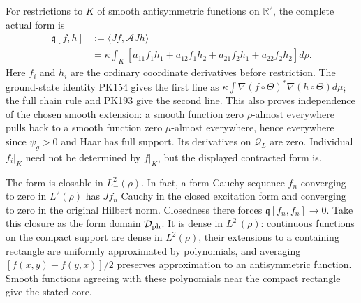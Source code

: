 \documentclass[11pt]{article}
\begin{document}
For restrictions to \(K\) of smooth antisymmetric functions on
\(\mathbb R^2\), the complete actual form is
\[
 \begin{split}
 \mathfrak q[f,h]
 &:=\langle Jf,\mathcal A Jh\rangle\\
 &=\kappa\int_K\left[
  a_{11}\overline{f_1}h_1+a_{12}\overline{f_1}h_2+
  a_{21}\overline{f_2}h_1+a_{22}\overline{f_2}h_2
                  \right]d\rho .
 \end{split}\tag{PK194}
\]
Here \(f_i\) and \(h_i\) are the ordinary coordinate derivatives
before restriction. The ground-state identity PK154 gives the
first line as \(\kappa\int\nabla(f\circ\Theta)^*
\nabla(h\circ\Theta)d\mu\); the full chain rule and PK193 give
the second line. This also proves independence of the chosen
smooth extension: a smooth function zero \(\rho\)-almost everywhere
pulls back to a smooth function zero \(\mu\)-almost everywhere,
hence everywhere since \(\psi_g>0\) and Haar has full support.
Its derivatives on \(\mathcal Q_L\) are zero.
Individual \(f_i|_K\) need not be determined by \(f|_K\), but the
displayed contracted form is.

The form is closable in \(L^2_-(\rho)\). In fact, a form-Cauchy
sequence \(f_n\) converging to zero in \(L^2(\rho)\) has \(Jf_n\)
Cauchy in the closed excitation form and converging to zero in
the original Hilbert norm. Closedness there forces
\(\mathfrak q[f_n,f_n]\to0\).
Take this closure as the form domain \(\mathcal D_{\rm ph}\).
It is dense in \(L^2_-(\rho)\): continuous functions on the compact
support are dense in \(L^2(\rho)\), their extensions to a containing
rectangle are uniformly approximated by polynomials, and averaging
\([f(x,y)-f(y,x)]/2\) preserves approximation to an antisymmetric
function. Smooth functions agreeing with these polynomials near
the compact rectangle give the stated core.
\end{document}
